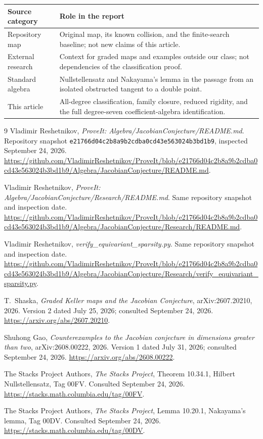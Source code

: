 \documentclass[11pt,a4paper]{article}
\numberwithin{equation}{section}
\theoremstyle{definition}
\theoremstyle{remark}
\begin{document}
\begin{center}
\begin{tabular}{@{}p{}p{}@{}}
\toprule
Source category & Role in the report\\
\midrule
Repository map & Original map, its known collision, and the finite-search
baseline; not new claims of this article.\\
External research & Context for graded maps and examples outside our class;
not dependencies of the classification proof.\\
Standard algebra & Nullstellensatz and Nakayama's lemma in the passage from
an isolated obstructed tangent to a double point.\\
This article & All-degree classification, family closure, reduced rigidity,
and the full degree-seven coefficient-algebra identification.\\
\bottomrule
\end{tabular}
\end{center}

\begin{thebibliography}{9}
\small
{}
Vladimir Reshetnikov, \emph{ProveIt: Algebra/JacobianConjecture/README.md}.
Repository snapshot \texttt{e21766d04c2b8a9b2cdba0cd43e563024b3bd1b9},
inspected September 24, 2026.
\url{https://github.com/VladimirReshetnikov/ProveIt/blob/e21766d04c2b8a9b2cdba0cd43e563024b3bd1b9/Algebra/JacobianConjecture/README.md}.

Vladimir Reshetnikov, \emph{ProveIt: Algebra/JacobianConjecture/Research/README.md}.
Same repository snapshot and inspection date.
\url{https://github.com/VladimirReshetnikov/ProveIt/blob/e21766d04c2b8a9b2cdba0cd43e563024b3bd1b9/Algebra/JacobianConjecture/Research/README.md}.

Vladimir Reshetnikov, \emph{verify\_equivariant\_sparsity.py}.
Same repository snapshot and inspection date.
\url{https://github.com/VladimirReshetnikov/ProveIt/blob/e21766d04c2b8a9b2cdba0cd43e563024b3bd1b9/Algebra/JacobianConjecture/Research/verify_equivariant_sparsity.py}.

T.~Shaska, \emph{Graded Keller maps and the Jacobian Conjecture},
arXiv:2607.20210, 2026. Version 2 dated July 25, 2026;
consulted September 24, 2026.
\url{https://arxiv.org/abs/2607.20210}.

Shuhong Gao, \emph{Counterexamples to the Jacobian conjecture in dimensions
greater than two}, arXiv:2608.00222, 2026. Version 1 dated July 31, 2026;
consulted September 24, 2026.
\url{https://arxiv.org/abs/2608.00222}.

The Stacks Project Authors, \emph{The Stacks Project},
Theorem 10.34.1, Hilbert Nullstellensatz, Tag 00FV.
Consulted September 24, 2026.
\url{https://stacks.math.columbia.edu/tag/00FV}.

The Stacks Project Authors, \emph{The Stacks Project},
Lemma 10.20.1, Nakayama's lemma, Tag 00DV.
Consulted September 24, 2026.
\url{https://stacks.math.columbia.edu/tag/00DV}.
\end{thebibliography}
\end{document}
